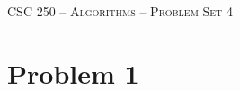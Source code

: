 \documentclass[11pt]{article}
\theoremstyle{nonumberplain}
\begin{document}



\begin{center}

{\LARGE
\textsc{CSC 250 -- Algorithms -- Problem Set 4}
\bigskip}

\bigskip
{\Large
}


\end{center}



\section*{Problem 1}

\end{document}
